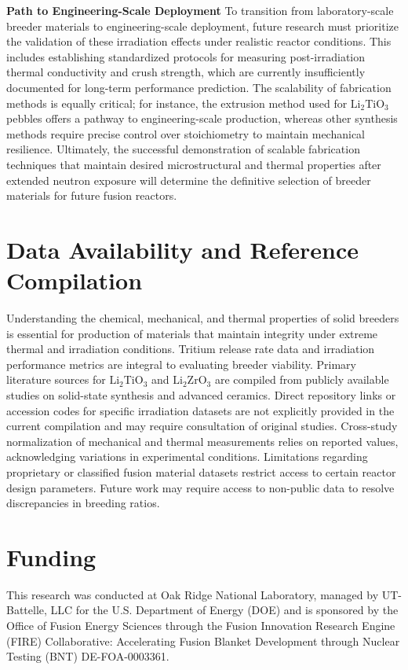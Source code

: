 \documentclass[review,12pt,a4paper]{elsarticle}
\begin{document}
\textbf{Path to Engineering-Scale Deployment}
\textcolor{medconf}{To transition from laboratory-scale breeder materials to engineering-scale deployment, future research must prioritize the validation of these irradiation effects under realistic reactor conditions. This includes establishing standardized protocols for measuring post-irradiation thermal conductivity and crush strength, which are currently insufficiently documented for long-term performance prediction. The scalability of fabrication methods is equally critical; for instance, the extrusion method used for $\mathrm{Li}_2\mathrm{TiO}_3$ pebbles offers a pathway to engineering-scale production, whereas other synthesis methods require precise control over stoichiometry to maintain mechanical resilience. Ultimately, the successful demonstration of scalable fabrication techniques that maintain desired microstructural and thermal properties after extended neutron exposure will determine the definitive selection of breeder materials for future fusion reactors.}

\section*{Data Availability and Reference Compilation}


\textcolor{medconf}{Understanding the chemical, mechanical, and thermal properties of solid breeders is essential for production of materials that maintain integrity under extreme thermal and irradiation conditions. Tritium release rate data and irradiation performance metrics are integral to evaluating breeder viability. Primary literature sources for $\mathrm{Li}_2\mathrm{TiO}_3$ and $\mathrm{Li}_2\mathrm{ZrO}_3$ are compiled from publicly available studies on solid-state synthesis and advanced ceramics. Direct repository links or accession codes for specific irradiation datasets are not explicitly provided in the current compilation and may require consultation of original studies. Cross-study normalization of mechanical and thermal measurements relies on reported values, acknowledging variations in experimental conditions. Limitations regarding proprietary or classified fusion material datasets restrict access to certain reactor design parameters. Future work may require access to non-public data to resolve discrepancies in breeding ratios.}

\section*{Funding}
This research was conducted at Oak Ridge National Laboratory, managed by UT-Battelle, LLC for the U.S. Department of Energy (DOE) and is sponsored by the Office of Fusion Energy Sciences through the Fusion Innovation Research Engine (FIRE) Collaborative: Accelerating Fusion Blanket Development through Nuclear Testing (BNT) DE-FOA-0003361.
\end{document}
